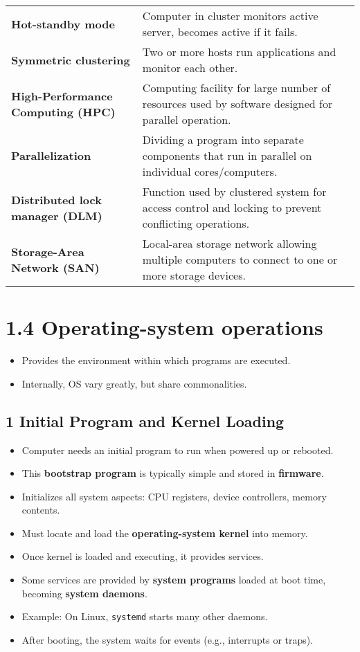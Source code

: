 \documentclass{article}
\begin{document}
\begin{tabular}{>{\raggedright}p{} >{\raggedright\arraybackslash}p{}}
\textbf{Hot-standby mode} & Computer in cluster monitors active server, becomes active if it fails. \\
\textbf{Symmetric clustering} & Two or more hosts run applications and monitor each other. \\
\textbf{High-Performance Computing (HPC)} & Computing facility for large number of resources used by software designed for parallel operation. \\
\textbf{Parallelization} & Dividing a program into separate components that run in parallel on individual cores/computers. \\
\textbf{Distributed lock manager (DLM)} & Function used by clustered system for access control and locking to prevent conflicting operations. \\
\textbf{Storage-Area Network (SAN)} & Local-area storage network allowing multiple computers to connect to one or more storage devices. \\
\bottomrule
\end{tabular}
\vspace{\baselineskip}

\newpage
\section*{1.4 Operating-system operations}
\begin{itemize}
    \item Provides the environment within which programs are executed.
    \item Internally, OS vary greatly, but share commonalities.
\end{itemize}

\subsection*{1 Initial Program and Kernel Loading}
\begin{itemize}
    \item Computer needs an initial program to run when powered up or rebooted.
    \item This \textbf{bootstrap program} is typically simple and stored in \textbf{firmware}.
    \item Initializes all system aspects: CPU registers, device controllers, memory contents.
    \item Must locate and load the \textbf{operating-system kernel} into memory.
    \item Once kernel is loaded and executing, it provides services.
    \item Some services are provided by \textbf{system programs} loaded at boot time, becoming \textbf{system daemons}.
    \item Example: On Linux, \texttt{systemd} starts many other daemons.
    \item After booting, the system waits for events (e.g., interrupts or traps).
\end{itemize}
\end{document}
